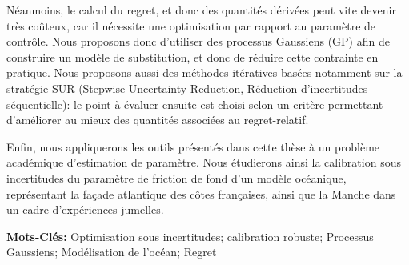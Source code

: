 \documentclass[12pt, a4paper]{article}
\begin{document}
Néanmoins, le calcul du regret, et donc des quantités dérivées peut
vite devenir très coûteux, car il nécessite une optimisation par
rapport au paramètre de contrôle. Nous proposons donc d'utiliser des
processus Gaussiens (GP) afin de construire un modèle de substitution,
et donc de réduire cette contrainte en pratique. Nous proposons aussi
des méthodes itératives basées notamment sur la stratégie SUR
(Stepwise Uncertainty Reduction, Réduction d'incertitudes
séquentielle): le point à évaluer ensuite est choisi selon un critère
permettant d'améliorer au mieux des quantités associées au
regret-relatif.

Enfin, nous appliquerons les outils présentés dans cette thèse à un
problème académique d'estimation de paramètre. Nous étudierons ainsi
la calibration sous incertitudes du paramètre de friction de fond d'un
modèle océanique, représentant la façade atlantique des côtes
françaises, ainsi que la Manche dans un cadre d'expériences jumelles.

\vspace{0.5cm}
\textbf{Mots-Clés:} Optimisation sous incertitudes; calibration
robuste; Processus Gaussiens; Modélisation de l'océan; Regret
\vfill
\end{document}
